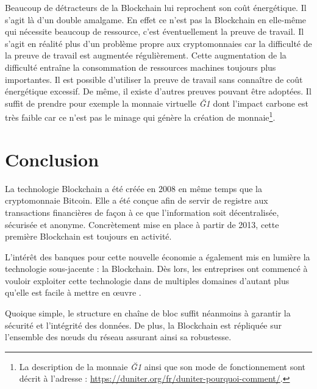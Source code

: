 \documentclass{article}
\newcommand{\oeuvre}{\oe uvre }
\newcommand{\noeuds}{n\oe uds }
\begin{document}
Beaucoup de détracteurs de la Blockchain lui reprochent son coût énergétique. Il s'agit là d'un double amalgame. En effet ce n'est pas la Blockchain en elle-même qui nécessite beaucoup de ressource, c'est éventuellement la preuve de travail. Il s'agit en réalité plus d'un problème propre aux cryptomonnaies car la difficulté de la preuve de travail est augmentée régulièrement. Cette augmentation de la difficulté entraîne la consommation de ressources machines toujours plus importantes. Il est possible d'utiliser la preuve de travail sans connaître de coût énergétique excessif. De même, il existe d'autres preuves pouvant être adoptées. Il suffit de prendre pour exemple la monnaie virtuelle \textit{Ğ1} dont l'impact carbone est très faible car ce n'est pas le minage qui génère la création de monnaie\footnote{La description de la monnaie \textit{Ğ1} ainsi que son mode de fonctionnement sont décrit à l'adresse : \url{https://duniter.org/fr/duniter-pourquoi-comment/}.}. 



\clearpage

\section*{Conclusion}

La technologie Blockchain a été créée en 2008 en même temps que la cryptomonnaie Bitcoin. Elle a été conçue afin de servir de registre aux transactions financières de façon à ce que l'information soit décentralisée, sécurisée et anonyme. Concrètement mise en place à partir de 2013, cette première Blockchain est toujours en activité.

L'intérêt des banques pour cette nouvelle économie a également mis en lumière la technologie sous-jacente : la Blockchain. Dès lors, les entreprises ont commencé à vouloir exploiter cette technologie dans de multiples domaines d'autant plus qu'elle est facile à mettre en \oeuvre.

Quoique simple, le structure en chaîne de bloc suffit néanmoins à garantir la sécurité et l'intégrité des données. De plus, la Blockchain est répliquée sur l'ensemble des \noeuds du réseau assurant ainsi sa robustesse.
\end{document}
